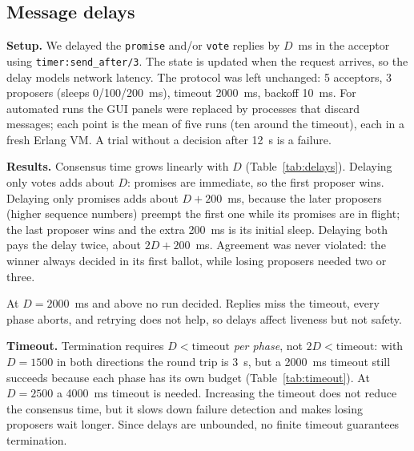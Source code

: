 \subsection{Message delays}

\textbf{Setup.}
We delayed the \texttt{promise} and/or \texttt{vote} replies by $D$~ms in the
acceptor using \texttt{timer:send\_after/3}. The state is updated when the
request arrives, so the delay models network latency. The protocol was left
unchanged: 5 acceptors, 3 proposers (sleeps 0/100/200~ms), timeout 2000~ms,
backoff 10~ms. For automated runs the GUI panels were replaced by processes
that discard messages; each point is the mean of five runs (ten around the
timeout), each in a fresh Erlang VM. A trial without a decision after 12~s is
a failure.


\textbf{Results.}
Consensus time grows linearly with $D$ (Table~\ref{tab:delays}). Delaying only
votes adds about $D$: promises are immediate, so the first proposer wins.
Delaying only promises adds about $D+200$~ms, because the later proposers
(higher sequence numbers) preempt the first one while its promises are in
flight; the last proposer wins and the extra 200~ms is its initial sleep.
Delaying both pays the delay twice, about $2D+200$~ms. Agreement was never
violated: the winner always decided in its first ballot, while losing
proposers needed two or three.

At $D=2000$~ms and above no run decided. Replies miss the timeout, every phase
aborts, and retrying does not help, so delays affect liveness but not safety.

\textbf{Timeout.}
Termination requires $D<\mathrm{timeout}$ \emph{per phase}, not
$2D<\mathrm{timeout}$: with $D=1500$ in both directions the round trip is
3~s, but a 2000~ms timeout still succeeds because each phase has its own
budget (Table~\ref{tab:timeout}). At $D=2500$ a 4000~ms timeout is needed.
Increasing the timeout does not reduce the consensus time, but it slows down
failure detection and makes losing proposers wait longer. Since delays are
unbounded, no finite timeout guarantees termination.

